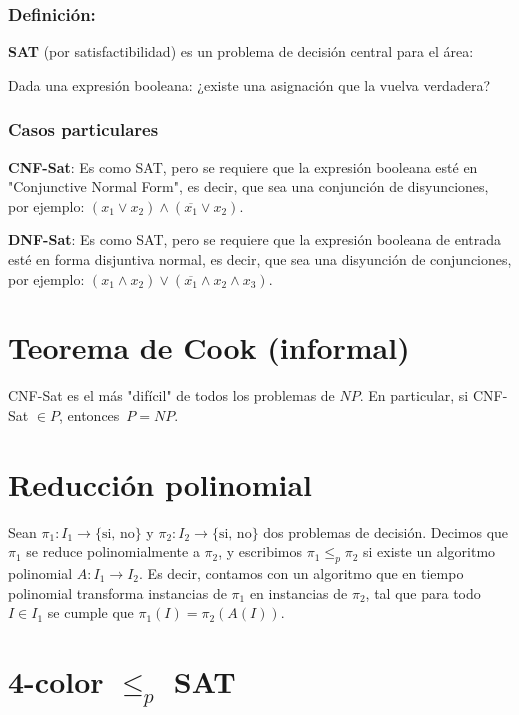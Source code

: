 \documentclass[10pt,a4paper]{article}
\begin{document}
\subsubsection*{Definición:}

\textbf{SAT} (por satisfactibilidad) es un problema de decisión central para el área:

\begin{center}
Dada una expresión booleana: ¿existe una asignación que la vuelva verdadera?
\end{center}

\subsubsection*{Casos particulares}

\textbf{CNF-Sat}: Es como SAT, pero se requiere que la expresión booleana esté en "Conjunctive Normal Form", es decir, que sea una conjunción de disyunciones, por ejemplo: $(x_1 \lor x_2) \land (\overline{x_1} \lor x_2)$.

\textbf{DNF-Sat}: Es como SAT, pero se requiere que la expresión booleana de entrada esté en forma disjuntiva normal, es decir, que sea una disyunción de conjunciones, por ejemplo: $(x_1 \land x_2) \lor (\overline{x_1} \land x_2 \land x_3)$.

\section*{Teorema de Cook (informal)}

CNF-Sat es el más "difícil" de todos los problemas de $NP$. En particular, si CNF-Sat $\in P$, entonces $P = NP$.

\section*{Reducción polinomial}

Sean $\pi_1:I_1\rightarrow \{\text{si, no}\} $ y $\pi_2:I_2\rightarrow \{\text{si, no}\}$ dos problemas de decisión. Decimos que $\pi_1$ se reduce polinomialmente a $\pi_2$, y escribimos $\pi_1 \leq_p \pi_2$ si existe un algoritmo polinomial $A: I_1 \rightarrow I_2$. Es decir, contamos con un algoritmo que en tiempo polinomial transforma instancias de $\pi_1$ en instancias de $\pi_2$, tal que para todo $I\in I_1$ se cumple que $\pi_1(I) = \pi_2(A(I))$.

\section*{4-color $\leq_p$ SAT}
\end{document}
